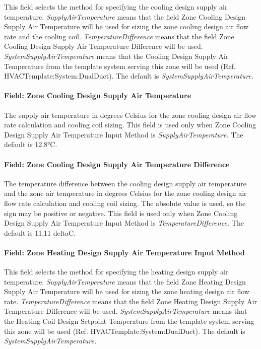 This field selects the method for specifying the cooling design supply air temperature. \emph{SupplyAirTemperature} means that the field Zone Cooling Design Supply Air Temperature will be used for sizing the zone cooling design air flow rate and the cooling coil. \emph{TemperatureDifference} means that the field Zone Cooling Design Supply Air Temperature Difference will be used. \emph{SystemSupplyAirTemperature} means that the Cooling Design Supply Air Temperature from the template system serving this zone will be used (Ref. HVACTemplate:System:DualDuct). The default is \emph{SystemSupplyAirTemperature.}

\paragraph{Field: Zone Cooling Design Supply Air Temperature}\label{field-zone-cooling-design-supply-air-temperature-9}

The supply air temperature in degrees Celsius for the zone cooling design air flow rate calculation and cooling coil sizing. This field is used only when Zone Cooling Design Supply Air Temperature Input Method is \emph{SupplyAirTemperature.} The default is 12.8°C.

\paragraph{Field: Zone Cooling Design Supply Air Temperature Difference}\label{field-zone-cooling-design-supply-air-temperature-difference-10}

The temperature difference between the cooling design supply air temperature and the zone air temperature in degrees Celsius for the zone cooling design air flow rate calculation and cooling coil sizing. The absolute value is used, so the sign may be positive or negative. This field is used only when Zone Cooling Design Supply Air Temperature Input Method is \emph{TemperatureDifference.} The default is 11.11 deltaC.

\paragraph{Field: Zone Heating Design Supply Air Temperature Input Method}\label{field-zone-heating-design-supply-air-temperature-input-method-10}

This field selects the method for specifying the heating design supply air temperature. \emph{SupplyAirTemperature} means that the field Zone Heating Design Supply Air Temperature will be used for sizing the zone heating design air flow rate. \emph{TemperatureDifference} means that the field Zone Heating Design Supply Air Temperature Difference will be used. \emph{SystemSupplyAirTemperature} means that the Heating Coil Design Setpoint Temperature from the template system serving this zone will be used (Ref. HVACTemplate:System:DualDuct). The default is \emph{SystemSupplyAirTemperature.}

